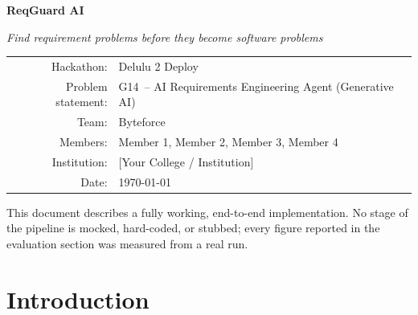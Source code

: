 \documentclass[11pt,a4paper]{article}
\title{\ProjectName}
\author{\TeamName}
\date{\SubmissionDate}
\newcommand{\ProjectName}{ReqGuard AI}
\newcommand{\ProblemCode}{G14}
\newcommand{\TeamName}{Byteforce}
\newcommand{\TeamMembers}{Member 1, Member 2, Member 3, Member 4}
\newcommand{\CollegeName}{[Your College / Institution]}
\newcommand{\SubmissionDate}{\today}
\begin{document}
\begin{titlepage}
  \centering
  \vspace*{1.2cm}
  {\Huge\bfseries\color{primary} \ProjectName\par}
  \vspace{0.4cm}
  {\Large\itshape Find requirement problems before they become software problems\par}
  \vspace{1.4cm}


  \vspace{1.8cm}
  {\large
  \begin{tabular}{r l}
    Hackathon:        & Delulu 2 Deploy \\
    Problem statement: & \ProblemCode\ -- AI Requirements Engineering Agent (Generative AI) \\
    Team:              & \TeamName \\
    Members:           & \TeamMembers \\
    Institution:       & \CollegeName \\
    Date:              & \SubmissionDate \\
  \end{tabular}
  }

  \vfill
  {\small This document describes a fully working, end-to-end implementation.
  No stage of the pipeline is mocked, hard-coded, or stubbed; every figure
  reported in the evaluation section was measured from a real run.\par}
\end{titlepage}

\tableofcontents
\newpage

\section{Introduction}
\end{document}

